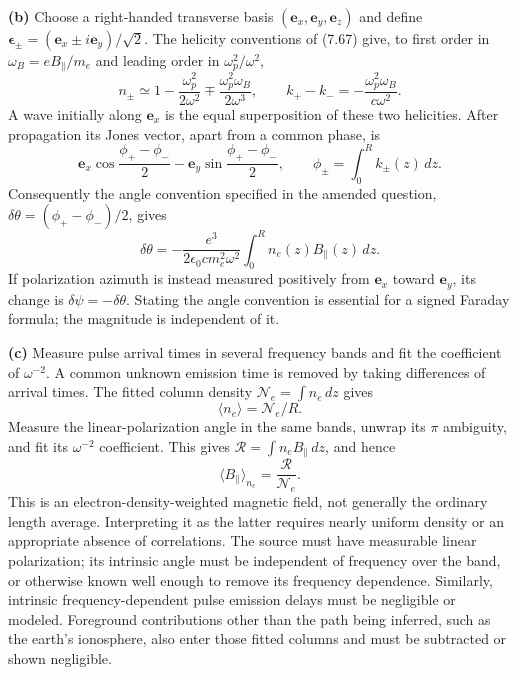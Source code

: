\textbf{(b)} Choose a right-handed transverse basis
$(\mathbf e_x,\mathbf e_y,\mathbf e_z)$ and define
$\boldsymbol\epsilon_\pm=(\mathbf e_x\pm i\mathbf e_y)/\sqrt2$.
The helicity conventions of (7.67) give, to first order in
$\omega_B=eB_\parallel/m_e$ and leading order in $\omega_p^2/\omega^2$,
\[
n_\pm\simeq1-\frac{\omega_p^2}{2\omega^2}
\mp\frac{\omega_p^2\omega_B}{2\omega^3},\qquad
k_+-k_-=-\frac{\omega_p^2\omega_B}{c\omega^2}.
\]
A wave initially along $\mathbf e_x$ is the equal superposition of
these two helicities. After propagation its Jones vector, apart
from a common phase, is
\[
\mathbf e_x\cos\frac{\phi_+-\phi_-}{2}
-\mathbf e_y\sin\frac{\phi_+-\phi_-}{2},\qquad
\phi_\pm=\int_0^R k_\pm(z)\,dz.
\]
Consequently the angle convention specified in the amended question,
$\delta\theta=(\phi_+-\phi_-)/2$, gives
\[
\boxed{\delta\theta=-\frac{e^3}{2\epsilon_0c m_e^2\omega^2}
\int_0^R n_e(z)B_\parallel(z)\,dz.}
\]
If polarization azimuth is instead measured positively from
$\mathbf e_x$ toward $\mathbf e_y$, its change is
$\delta\psi=-\delta\theta$. Stating the angle convention is essential
for a signed Faraday formula; the magnitude is independent of it.

\textbf{(c)} Measure pulse arrival times in several frequency bands
and fit the coefficient of $\omega^{-2}$. A common unknown emission
time is removed by taking differences of arrival times. The fitted
column density $\mathcal N_e=\int n_e\,dz$ gives
\[
\langle n_e\rangle=\mathcal N_e/R.
\]
Measure the linear-polarization angle in the same bands, unwrap its
$\pi$ ambiguity, and fit its $\omega^{-2}$ coefficient. This gives
$\mathcal R=\int n_e B_\parallel\,dz$, and hence
\[
\boxed{\langle B_\parallel\rangle_{n_e}
=\frac{\mathcal R}{\mathcal N_e}.}
\]
This is an electron-density-weighted magnetic field, not generally
the ordinary length average. Interpreting it as the latter requires
nearly uniform density or an appropriate absence of correlations.
The source must have measurable linear polarization; its intrinsic
angle must be independent of frequency over the band, or otherwise
known well enough to remove its frequency dependence. Similarly,
intrinsic frequency-dependent pulse emission delays must be
negligible or modeled. Foreground contributions other than the
path being inferred, such as the earth's ionosphere, also enter
those fitted columns and must be subtracted or shown negligible.


